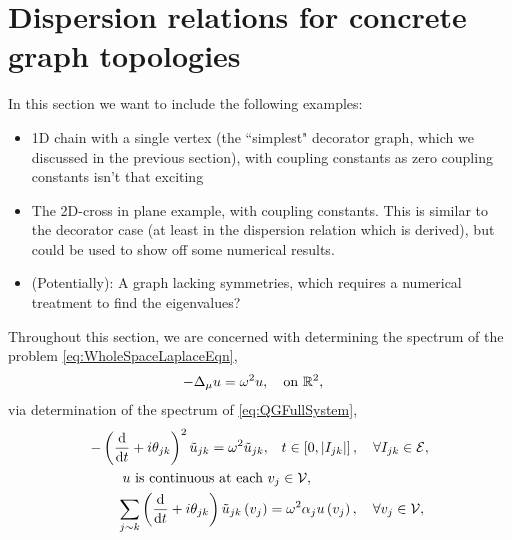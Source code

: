 \section{Dispersion relations for concrete graph topologies} \label{sec:Examples}
In this section we want to include the following examples:
\begin{itemize}
	\item 1D chain with a single vertex (the ``simplest" decorator graph, which we discussed in the previous section), with coupling constants as zero coupling constants isn't that exciting
	\item The 2D-cross in plane example, with coupling constants. This is similar to the decorator case (at least in the dispersion relation which is derived), but could be used to show off some numerical results.
	\item (Potentially): A graph lacking symmetries, which requires a numerical treatment to find the eigenvalues?
\end{itemize}

Throughout this section, we are concerned with determining the spectrum of the problem \eqref{eq:WholeSpaceLaplaceEqn},
\begin{align*}
	-\Delta_{\mu} u &= \omega^2 u, \quad\text{on } \mathbb{R}^2,
\end{align*}
via determination of the spectrum of \eqref{eq:QGFullSystem},
\begin{align*}
	-\left( \dfrac{\mathrm{d}}{\mathrm{d}t} + i\theta_{jk} \right)^2 \tilde{u}_{jk} = \omega^2 \tilde{u}_{jk}, &\quad t\in\left[ 0,\left\lvert I_{jk} \right\rvert \right], \quad \forall I_{jk}\in \mathcal{E}, \\
	u \text{ is continuous at each } &v_j \in \mathcal{V}, \\
	\sum_{j\sim k}\left( \dfrac{\mathrm{d}}{\mathrm{d}t} + i\theta_{jk} \right)\tilde{u}_{jk}\left( v_j \right) &= \omega^2\alpha_{j}u\left( v_j \right),  \quad \forall v_j \in \mathcal{V},
\end{align*}

